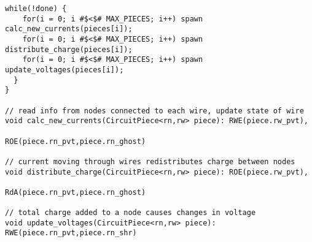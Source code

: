 \begin{lstlisting}[float={t},label={lst:code_ex},caption={Circuit Simulation Code Example}]
  while(!done) {
    for(i = 0; i #$<$# MAX_PIECES; i++) spawn calc_new_currents(pieces[i]);
    for(i = 0; i #$<$# MAX_PIECES; i++) spawn distribute_charge(pieces[i]);
    for(i = 0; i #$<$# MAX_PIECES; i++) spawn update_voltages(pieces[i]);
  }
}

// read info from nodes connected to each wire, update state of wire
void calc_new_currents(CircuitPiece<rn,rw> piece): RWE(piece.rw_pvt),
                                                                         ROE(piece.rn_pvt,piece.rn_ghost)

// current moving through wires redistributes charge between nodes
void distribute_charge(CircuitPiece<rn,rw> piece): ROE(piece.rw_pvt),
                                                                         RdA(piece.rn_pvt,piece.rn_ghost)

// total charge added to a node causes changes in voltage
void update_voltages(CircuitPiece<rn,rw> piece): RWE(piece.rn_pvt,piece.rn_shr)
\end{lstlisting}
